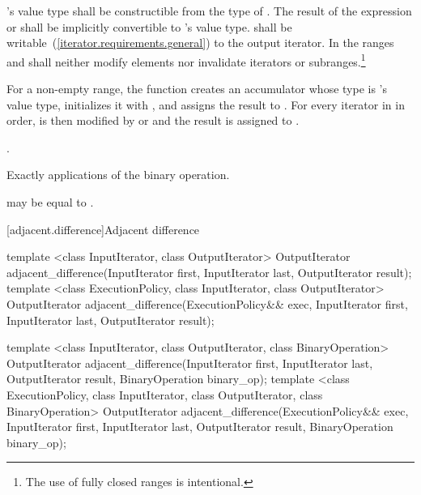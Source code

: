 \documentclass[ebook,11pt,article]{memoir}
\begin{document}
\begin{itemdescr}
\pnum
\requires
{}'s value type shall be constructible from the type of .
The result of the expression \tcode{}\added{\tcode{)}} 
or \added{\tcode{)}} shall be
implicitly convertible to 's value type. 
shall be writable~(\ref{iterator.requirements.general}) to the  output iterator.
In the ranges
and
shall neither modify elements nor invalidate iterators or subranges.\footnote{The use of fully closed ranges is intentional.
}

\pnum
\effects For a non-empty range,
the function creates an accumulator  whose type is 's
value type, initializes it with ,
and assigns the result to . For every iterator  in 
in order,  is then modified by \added{\tcode{)}} or \added{\tcode{)}}
and the result is assigned to .

\pnum
\returns
{}.

\pnum
\complexity
Exactly
applications of
the binary operation.

\pnum
\remarks
{}
may be equal to
.
\end{itemdescr}

[adjacent.difference]{Adjacent difference}

%
\begin{itemdecl}
template <class InputIterator, class OutputIterator>
  OutputIterator
    adjacent_difference(InputIterator first, InputIterator last,
                        OutputIterator result);
template <class ExecutionPolicy, class InputIterator, class OutputIterator>
  OutputIterator
    adjacent_difference(ExecutionPolicy&& exec,
                        InputIterator first, InputIterator last,
                        OutputIterator result);

template <class InputIterator, class OutputIterator, class BinaryOperation>
  OutputIterator
    adjacent_difference(InputIterator first, InputIterator last,
                        OutputIterator result,
                        BinaryOperation binary_op);
template <class ExecutionPolicy, class InputIterator, class OutputIterator, class BinaryOperation>
  OutputIterator
    adjacent_difference(ExecutionPolicy&& exec,
                        InputIterator first, InputIterator last,
                        OutputIterator result,
                        BinaryOperation binary_op);
\end{itemdecl}
\end{document}
